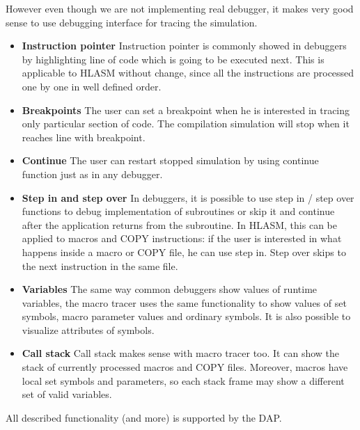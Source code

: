 However even though we are not implementing real debugger, it makes very good sense to use debugging interface for tracing the simulation.
\begin{itemize}
	\item \textbf{Instruction pointer} Instruction pointer is commonly showed in debuggers by highlighting line of code which is going to be executed next. This is applicable to HLASM without change, since all the instructions are processed one by one in well defined order.
	\item \textbf{Breakpoints} The user can set a breakpoint when he is interested in tracing only particular section of code. The compilation simulation will stop when it reaches line with breakpoint.
	\item \textbf{Continue} The user can restart stopped simulation by using continue function just as in any debugger.
	\item \textbf{Step in and step over} In debuggers, it is possible to use step in / step over functions to debug implementation of subroutines or skip it and continue after the application returns from the subroutine. In HLASM, this can be applied to macros and COPY instructions: if the user is interested in what happens inside a macro or COPY file, he can use step in. Step over skips to the next instruction in the same file.
	\item \textbf{Variables} The same way common debuggers show values of runtime variables, the macro tracer uses the same functionality to show values of set symbols, macro parameter values and ordinary symbols. It is also possible to visualize attributes of symbols.
	\item \textbf{Call stack} Call stack makes sense with macro tracer too. It can show the stack of currently processed macros and COPY files. Moreover, macros have local set symbols and parameters, so each stack frame may show a different set of valid variables.
\end{itemize}
All described functionality (and more) is supported by the DAP. 
  
